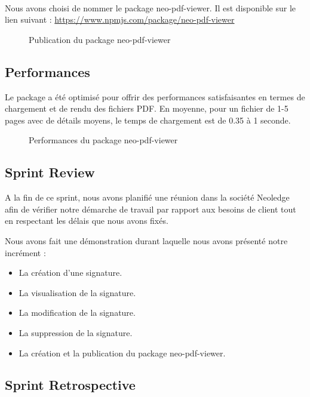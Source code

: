 \\
Nous avons choisi de nommer le package neo-pdf-viewer. Il est disponible sur le lien suivant : \url{https://www.npmjs.com/package/neo-pdf-viewer}

\begin{figure}
  \centering
  \caption{Publication du package neo-pdf-viewer}
  \label{fig:npm_package}
\end{figure}

\subsection{Performances}
Le package a été optimisé pour offrir des performances satisfaisantes en termes de chargement et de rendu des fichiers PDF.
En moyenne, pour un fichier de 1-5 pages avec de détails moyens, le temps de chargement est de 0.35 à 1 seconde.

\begin{figure}[H]
  \centering
  \caption{Performances du package neo-pdf-viewer}
  \label{fig:performance_package}
\end{figure}


\subsection{Sprint Review}
A la fin de ce sprint, nous avons planifié une réunion dans la société Neoledge afin de vérifier notre démarche de travail par rapport aux besoins de client  tout en respectant les délais que nous avons fixés.

Nous avons fait une démonstration durant laquelle nous avons présenté notre incrément :

\begin{itemize}
  \item La création d'une signature.
  \item La visualisation de la signature.
  \item La modification de la signature.
  \item La suppression de la signature.
  \item La création et la publication du package neo-pdf-viewer.
\end{itemize}

\subsection{Sprint Retrospective}

